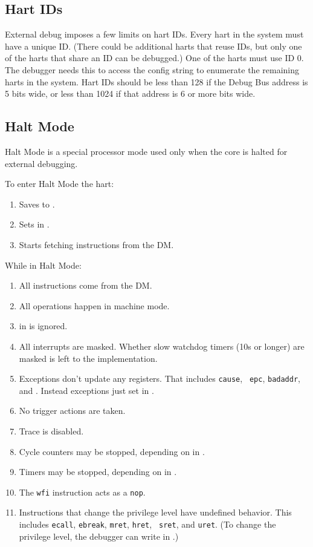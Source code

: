 \documentclass{article}
\newenvironment{steps}[1]
{
   \vspace{1ex}
   \noindent
   #1
   \begin{enumerate}[nosep]
}
{
   \end{enumerate}
   \vspace{1ex}
}
\begin{document}
\subsection{Hart IDs}

External debug imposes a few limits on hart IDs. Every hart in the system must
have a unique ID. (There could be additional harts that reuse IDs, but only one
of the harts that share an ID can be debugged.) One of the harts must use ID 0.
The debugger needs this to access the config string to enumerate the remaining
harts in the system. Hart IDs should be less than 128 if the Debug Bus address
is 5 bits wide, or less than 1024 if that address is 6 or more bits wide.

\subsection{Halt Mode}

Halt Mode is a special processor mode used only when the core is halted for
external debugging.

\begin{steps}{To enter Halt Mode the hart:}
\item Saves \Rpc to \Rdpc.
\item Sets \Fcause in \Rdcsr.
\item Starts fetching instructions from the DM.
\end{steps}

\begin{steps}{While in Halt Mode:}
\item All instructions come from the DM.
\item All operations happen in machine mode.
\item \Fmprv in \Rmstatus is ignored.
\item All interrupts are masked. Whether slow watchdog timers (10s or longer)
    are masked is left to the implementation.
\item Exceptions don't update any registers.  That includes {\tt cause}, {\tt
    epc}, {\tt badaddr}, and \Rmstatus.  Instead exceptions just set \Fhmexc in
    \Rdcsr.
\item No trigger actions are taken.
\item Trace is disabled.
\item Cycle counters may be stopped, depending on \Fstopcycle in \Rdcsr.
\item Timers may be stopped, depending on \Fstoptime in \Rdcsr.
\item The {\tt wfi} instruction acts as a {\tt nop}.
\item Instructions that change the privilege level have undefined behavior.
    This includes {\tt ecall}, {\tt ebreak}, {\tt mret}, {\tt hret}, {\tt
    sret}, and {\tt uret}.  (To change the privilege level, the debugger can
    write \Fprv in \Rdcsr.)
\end{steps}
\end{document}
